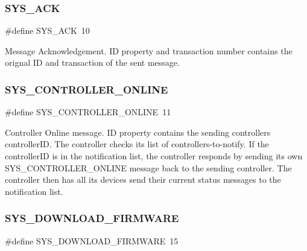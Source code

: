 \subsubsection{\texorpdfstring{S\+Y\+S\+\_\+\+A\+CK}{SYS\_ACK}}
{\footnotesize\ttfamily \#define S\+Y\+S\+\_\+\+A\+CK~10}

Message Acknowledgement. ID property and transaction number contains the orignal ID and transaction of the sent message. \mbox{\label{group___u_d_p_message_i_d_ga23aab89076591390a1dbc412a3a07314}} 
\subsubsection{\texorpdfstring{S\+Y\+S\+\_\+\+C\+O\+N\+T\+R\+O\+L\+L\+E\+R\+\_\+\+O\+N\+L\+I\+NE}{SYS\_CONTROLLER\_ONLINE}}
{\footnotesize\ttfamily \#define S\+Y\+S\+\_\+\+C\+O\+N\+T\+R\+O\+L\+L\+E\+R\+\_\+\+O\+N\+L\+I\+NE~11}

Controller Online message. ID property contains the sending controller\textquotesingle{}s controller\+ID. The controller checks its list of controllers-\/to-\/notify. If the controller\+ID is in the notification list, the controller responds by sending its own S\+Y\+S\+\_\+\+C\+O\+N\+T\+R\+O\+L\+L\+E\+R\+\_\+\+O\+N\+L\+I\+NE message back to the sending controller. The controller then has all its devices send their current status messages to the notification list. \mbox{\label{group___u_d_p_message_i_d_ga88b6f619a28320e9136847e9b1b27a36}} 
\subsubsection{\texorpdfstring{S\+Y\+S\+\_\+\+D\+O\+W\+N\+L\+O\+A\+D\+\_\+\+F\+I\+R\+M\+W\+A\+RE}{SYS\_DOWNLOAD\_FIRMWARE}}
{\footnotesize\ttfamily \#define S\+Y\+S\+\_\+\+D\+O\+W\+N\+L\+O\+A\+D\+\_\+\+F\+I\+R\+M\+W\+A\+RE~15}

